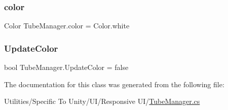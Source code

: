 \subsubsection{\texorpdfstring{color}{color}}
{\footnotesize\ttfamily Color Tube\+Manager.\+color = Color.\+white}

\mbox{\label{class_tube_manager_a7b5de091047832cf01250cd3d0faaf87}} 
\subsubsection{\texorpdfstring{Update\+Color}{UpdateColor}}
{\footnotesize\ttfamily bool Tube\+Manager.\+Update\+Color = false}



The documentation for this class was generated from the following file\+:\begin{DoxyCompactItemize}
\item 
Utilities/\+Specific To Unity/\+U\+I/\+Responsive U\+I/\hyperlink{_tube_manager_8cs}{Tube\+Manager.\+cs}\end{DoxyCompactItemize}

